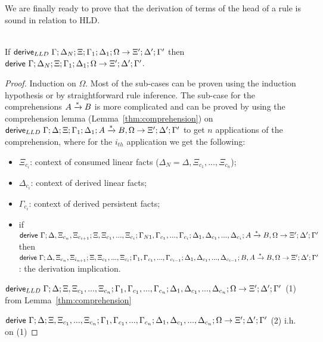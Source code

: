We are finally ready to prove that the derivation of terms of the head of a rule is sound in relation to HLD.

\begin{lemma}
\hspace{0.5cm}\\
If $\mathsf{derive}_{LLD} \; \Gamma; \Delta_N; \Xi; \Gamma_1; \Delta_1; \Omega \rightarrow \Xi'; \Delta'; \Gamma'$ then $\mathsf{derive}~ \Gamma; \Delta_N; \Xi; \Gamma_1; \Delta_1; \Omega \rightarrow \Xi'; \Delta'; \Gamma'$.
\end{lemma}

\begin{proof}\label{sec:derivation_theorem}
Induction on $\Omega$. Most of the sub-cases can be proven using the induction hypothesis or by
straightforward rule inference. The sub-case for the comprehensions $A \xrightarrow{*} B$ is more
complicated and can be proved by using the comprehension lemma (Lemma~\ref{thm:comprehension}) on $\mathsf{derive}_{LLD} \; \Gamma; \Delta; \Xi; \Gamma_1; \Delta_1; A \xrightarrow{*} B, \Omega \rightarrow \Xi'; \Delta'; \Gamma'$
 to get $n$ applications of the comprehension, where for the $i_{th}$ application we get the following:

\begin{itemize}
   \item $\Xi_{c_i}$: context of consumed linear facts ($\Delta_N = \Delta, \Xi_{c_1}, ..., \Xi_{c_n}$);
   \item $\Delta_{c_i}$: context of derived linear facts;
   \item $\Gamma_{c_i}$: context of derived persistent facts;
   \item if $\mathsf{derive}~ \Gamma; \Delta, \Xi_{c_n}, \Xi_{c_{i+1}}; \Xi, \Xi_{c_1}, ..., \Xi_{c_i}; \Gamma_{N1}, \Gamma_{c_1}, ..., \Gamma_{c_i}; \Delta_1, \Delta_{c_1}, ..., \Delta_{c_i}; A \xrightarrow{*} B, \Omega \rightarrow \Xi'; \Delta'; \Gamma'$ then \linebreak $\mathsf{derive}~ \Gamma; \Delta, \Xi_{c_n}, \Xi_{i_{n+1}}; \Xi, \Xi_{c_1}, ..., \Xi_{c_i}; \Gamma_1, \Gamma_{c_1}, ..., \Gamma_{c_{i-1}}; \Delta_1, \Delta_{c_1}, ..., \Delta_{c_{i-1}}; B, A \xrightarrow{*} B, \Omega \rightarrow \Xi'; \Delta'; \Gamma'$: the derivation implication.
\end{itemize}

$\mathsf{derive}_{LLD} \; \Gamma; \Delta; \Xi, \Xi_{c_1}, ..., \Xi_{c_n}; \Gamma_1, \Gamma_{c_1}, ..., \Gamma_{c_n}; \Delta_1, \Delta_{c_1}, ..., \Delta_{c_n}; \Omega \rightarrow \Xi'; \Delta'; \Gamma'$ \hfill (1) from Lemma~\ref{thm:comprehension}

$\mathsf{derive}~ \Gamma; \Delta; \Xi, \Xi_{c_1}, ..., \Xi_{c_n}; \Gamma_1, \Gamma_{c_1}, ..., \Gamma_{c_n}; \Delta_1, \Delta_{c_1}, ..., \Delta_{c_n}; \Omega \rightarrow \Xi'; \Delta'; \Gamma'$ \hfill (2) i.h. on (1)


\end{proof}
